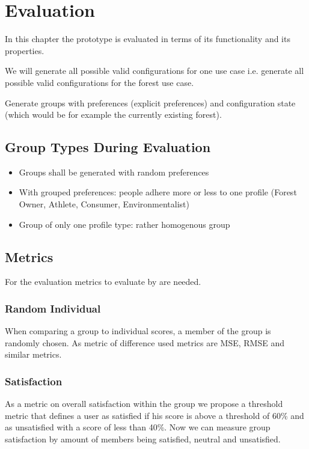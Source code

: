 \chapter{Evaluation}
\label{ch:Evaluation}

In this chapter the prototype is evaluated in terms of its functionality and its properties.

We will generate all possible valid configurations for one use case i.e. generate all possible valid configurations for the forest use case.

Generate groups with preferences (explicit preferences) and configuration state (which would be for example the currently existing forest).

\section{Group Types During Evaluation}
\label{sec:Evaluation:GroupTypes}

\begin{itemize}
    \item Groups shall be generated with random preferences
    \item With grouped preferences: people adhere more or less to one profile (Forest Owner, Athlete, Consumer, Environmentalist)
    \item Group of only one profile type: rather homogenous group
\end{itemize}

\section{Metrics}
For the evaluation metrics to evaluate by are needed. 

\label{sec:Evaluation:Metrics}

\subsection{Random Individual}
When comparing a group to individual scores, a member of the group is randomly chosen. As metric of difference used metrics are MSE, RMSE and similar metrics.

\subsection{Satisfaction}
As a metric on overall satisfaction within the group we propose a threshold metric that defines a user as satisfied if his score is above a threshold of 60\% and as unsatisfied with a score of less than 40\%. Now we can measure group satisfaction by amount of members being satisfied, neutral and unsatisfied.

